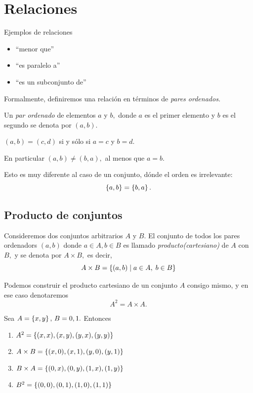 \section{Relaciones}


	{Ejemplos de relaciones}
	\begin{itemize}
		\item ``menor que''
		\item ``es paralelo a''
		\item ``es un subconjunto de''
	\end{itemize}
	



	Formalmente, definiremos una relación en t\'erminos de \emph{pares ordenados.}



	\begin{defn}
		Un \emph{par ordenado} de elementos $a$ y $b,$ donde $a$ es el primer elemento y $b$ es el segundo se denota por $(a,b).$
	\end{defn}
	



	
	\begin{ax}
		$(a,b)=(c,d)$  si y sólo si $a=c$ y
		$b=d.$
	\end{ax}
	
	
	
	En particular $(a,b)\neq(b,a),$  al menos que $a=b.$
	
	
	
	Esto es muy diferente al caso de un conjunto, dónde el orden es irrelevante:
	$$
	\left\{ a,b \right\}=\left\{ b,a \right\}.
	$$


\subsection{Producto de conjuntos}


	Consideremos dos conjuntos arbitrarios $A$ y $B.$ El conjunto de todos los pares ordenadors $(a,b)$ donde $a\in A, b \in B$ es llamado \emph{producto(cartesiano)} de $A$ con $B,$ y se denota por $A \times B,$ es decir,
	$$
	A \times B = \left\{ (a,b) \mid a \in A, \; b \in B \right\}
	$$



	Podemos construir el producto cartesiano de un conjunto $A$ consigo mismo, y en ese caso denotaremos
	$$A^{2}= A\times A.$$



	\begin{problema}
		Sea $A=\left\{ x,y \right\}, \, B={0,1}.$ Entonces
		\begin{enumerate}
			\item $A^{2}=\left\{ (x,x), (x,y), (y,x), (y,y) \right\}$
			\item $A\times B= \left\{ (x,0), (x,1), (y,0), (y,1) \right\}$
			\item $B\times A= \left\{ (0,x), (0,y), (1, x), (1,y) \right\}$
			\item $B^2=\left\{ (0,0), (0,1), (1,0), (1,1) \right\}$
		\end{enumerate}
		
	\end{problema}
	



